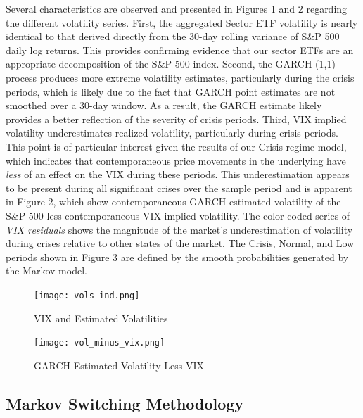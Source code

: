 \documentclass[11pt,a4paper,oldfontcommands]{memoir}
\begin{document}
{Several characteristics are observed and presented in Figures 1 and 2 regarding the different volatility series. First, the aggregated Sector ETF volatility is nearly identical to that derived directly from the 30-day rolling variance of S\&P 500 daily log returns. This provides confirming evidence that our sector ETFs are an appropriate decomposition of the S\&P 500 index. Second, the GARCH (1,1) process produces more extreme volatility estimates, particularly during the crisis periods, which is likely due to the fact that GARCH point estimates are not smoothed over a 30-day window. As a result, the GARCH estimate likely provides a better reflection of the severity of crisis periods. Third, VIX implied volatility underestimates realized volatility, particularly during crisis periods. This point is of particular interest given the results of our Crisis regime model, which indicates that contemporaneous price movements in the underlying have \textit{less} of an effect on the VIX during these periods. This underestimation appears to be present during all significant crises over the sample period and is apparent in Figure 2, which show contemporaneous GARCH estimated volatility of the S\&P 500 less contemporaneous VIX implied volatility. The color-coded series of \textit{VIX residuals} shows the magnitude of the market's underestimation of volatility during crises relative to other states of the market. The Crisis, Normal, and Low periods shown in Figure 3 are defined by the smooth probabilities generated by the Markov model.


\begin{figure}[H]
\caption{VIX and Estimated Volatilities}
\texttt{[image: vols\_ind.png]} 
\centering
\label{}
\end{figure}

\begin{figure}[H]
\caption{GARCH Estimated Volatility Less VIX}
\texttt{[image: vol\_minus\_vix.png]} 
\centering
\label{}
\end{figure}

\subsection{Markov Switching Methodology}

}
\end{document}
